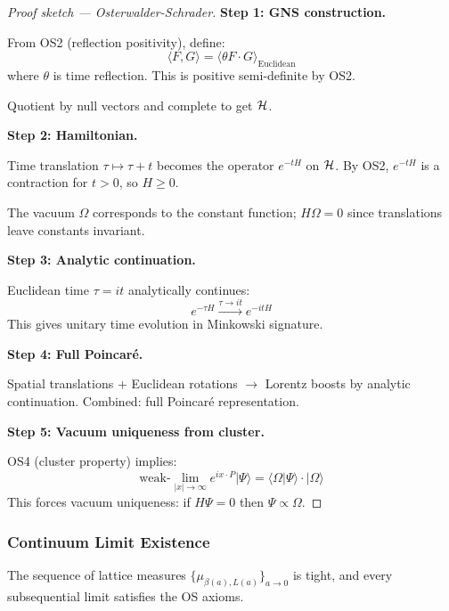 \begin{proof}[Proof sketch --- Osterwalder-Schrader]
\textbf{Step 1: GNS construction.}

From OS2 (reflection positivity), define:
\[
\langle F, G \rangle = \langle \theta F \cdot G \rangle_{\text{Euclidean}}
\]
where $\theta$ is time reflection. This is positive semi-definite by OS2.

Quotient by null vectors and complete to get $\mathcal{H}$.

\textbf{Step 2: Hamiltonian.}

Time translation $\tau \mapsto \tau + t$ becomes the operator $e^{-tH}$ on $\mathcal{H}$.
By OS2, $e^{-tH}$ is a contraction for $t > 0$, so $H \geq 0$.

The vacuum $\Omega$ corresponds to the constant function; $H\Omega = 0$ since 
translations leave constants invariant.

\textbf{Step 3: Analytic continuation.}

Euclidean time $\tau = it$ analytically continues:
\[
e^{-\tau H} \xrightarrow{\tau \to it} e^{-itH}
\]
This gives unitary time evolution in Minkowski signature.

\textbf{Step 4: Full Poincar\'e.}

Spatial translations + Euclidean rotations $\to$ Lorentz boosts by analytic continuation.
Combined: full Poincar\'e representation.

\textbf{Step 5: Vacuum uniqueness from cluster.}

OS4 (cluster property) implies:
\[
\text{weak-}\lim_{|x| \to \infty} e^{ix \cdot P} |\Psi\rangle = \langle \Omega | \Psi \rangle \cdot |\Omega\rangle
\]
This forces vacuum uniqueness: if $H\Psi = 0$ then $\Psi \propto \Omega$.
\end{proof}

\subsubsection{Continuum Limit Existence}

\begin{theorem}
\label{thm:tightness-complete}
The sequence of lattice measures $\{\mu_{\beta(a),L(a)}\}_{a \to 0}$ is tight, 
and every subsequential limit satisfies the OS axioms.
\end{theorem}

